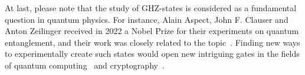 At last, please note that the study of GHZ-states is considered as a fundamental question in quantum physics.
For instance, Alain Aspect, John F. Clauser and Anton Zeilinger received in 2022 a Nobel Prize for their experiments on quantum entanglement, and their work was closely related to the topic~\cite{nobelprizeNobelPrize}.
Finding new ways to experimentally create such states would open new intriguing gates in the fields of quantum computing~\cite{gu2020compact} and cryptography~\cite{pivoluska2018layered}.\\
